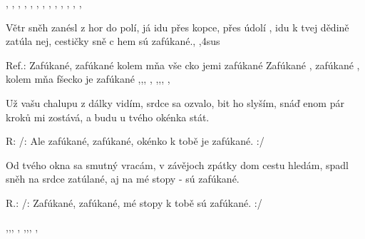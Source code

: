 \resetVars
{}
\MakeHeader
\Lyrics

, , , , , ,
, , , ,
, , , 

Větr sněh zanésl z hor do polí,
já idu přes kopce, přes údolí ,
idu k tvej dědině zatúla nej,
cestičky sně c hem sú zafúkané., ,4sus

Ref.: Zafúkané, zafúkané
kolem mňa vše cko jemi zafúkané
Zafúkané , zafúkané ,
kolem mňa fšecko je zafúkané ,,, , ,,, , 

Už vašu chalupu z dálky vidím,
srdce sa ozvalo, bit ho slyším,
snáď enom pár kroků mi zostává,
a budu u tvého okénka stát.

R: /: Ale zafúkané, zafúkané,
okénko k tobě je zafúkané. :/

Od tvého okna sa smutný vracám,
v závějoch zpátky dom cestu hledám,
spadl sněh na srdce zatúlané,
aj na mé stopy - sú zafúkané.

R.: /: Zafúkané, zafúkané,
mé stopy k tobě sú zafúkané. :/

,,, ,
,,, ,

\Next
